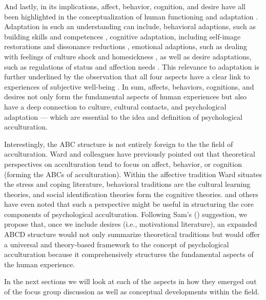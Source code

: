 \documentclass[man, 12pt, a4paper]{apa7}
\begin{document}
And lastly, in its implications, affect, behavior, cognition, and desire have all been highlighted in the conceptualization of human functioning and adaptation \citep[a core outcome for many acculturation researchers; e.g., see][]{Berry2006a,Searle1990,Ward2001,Maertz2016}. Adaptation in such an understanding can include, behavioral adaptions, such as building skills and competences \citep[e.g.,][]{Bevan1965}, cognitive adaptation, including self-image restorations and dissonance reductions \citep[e.g.,][]{Czajkowska2017}, emotional adaptions, such as dealing with feelings of culture shock and homesickness \citep[e.g.,][]{Smith1990, VanTilburg1996}, as well as desire adaptations, such as regulations of status and affection needs \citep[e.g.,][]{Steverink2006}. This relevance to adaptation is further underlined by the observation that all four aspects have a clear link to experiences of subjective well-being \citep[e.g.,][]{Luhmann2012}. In sum, affects, behaviors, cognitions, and desires not only form the fundamental aspects of human experiences but also have a deep connection to culture, cultural contacts, and psychological adaptation --- which are essential to the idea and definition of psychological acculturation.

Interestingly, the ABC structure is not entirely foreign to the the field of acculturation. Ward and colleagues \citep{Ward2001, Masgoret2006, Ward2019} have previously pointed out that theoretical perspectives on acculturation tend to focus on affect, behavior, or cognition (forming the ABCs of acculturation). Within the affective tradition Ward situates the stress and coping literature, behavioral traditions are the cultural learning theories, and social identification theories form the cognitive theories. \citet{Sam2006b} and others have even noted that such a perspective might be useful in structuring the core components of psychological acculturation. 
Following Sam's (\citeyear{Sam2006b}) suggestion, we propose that, once we include desires (i.e., motivational literature), an expanded ABCD structure would not only summarize theoretical traditions but would offer a universal and theory-based framework to the concept of psychological acculturation because it comprehensively structures the fundamental aspects of the human experience.

In the next sections we will look at each of the aspects in how they emerged out of the focus group discussion as well as conceptual developments within the field. 
\end{document}

